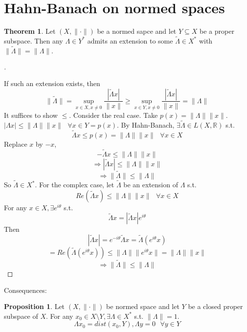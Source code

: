 \documentclass{article}
\newcommand{\sfa}{\text{  } \forall}
\theoremstyle{definition}
\newtheorem{thm}{Theorem}
\newtheorem{prop}{Proposition}
\newenvironment{proofs}[1][\proofname]{%
  \begin{proof}[#1]$ $\par\nobreak\ignorespaces
}{%
  \end{proof}
}
\begin{document}
\section{Hahn-Banach on normed spaces}

\begin{thm}
	Let $(X, \|\cdot \|)$ be a normed sapce and let $Y \subseteq X$ be a proper subspace. 
	Then any $\Lambda \in Y^*$ admits an extension to some $\tilde{\Lambda} \in X^*$ with $\| \tilde{\Lambda} \| = \|\Lambda \|$.
\end{thm}

\begin{proofs}
	If such an extension exists, then
	\[
		\|\tilde{\Lambda} \| = \sup_{x \in X, x \neq 0} \frac{|\tilde{\Lambda} x|}{\|x\|} \geq \sup_{x \in Y, x \neq 0} \frac{|\tilde{\Lambda} x|}{\|x\|} = \|\Lambda\|
	\]
	It suffices to show $\leq$.
	Consider the real case.
	Take $p(x) = \| \Lambda \| \| x \|$.
	$|\Lambda x| \leq \| \Lambda \| \| x \| \sfa x \in Y = p(x) $.
	By Hahn-Banach, $\exists \tilde{\Lambda} \in L(X, \mathbb{R})$ s.t.
	\[
		\tilde{\Lambda} x \leq p(x) = \| \Lambda \| \|x \| \sfa x \in X 
	\]
	Replace $x$ by $-x$,
	\[
		-\tilde{\Lambda} x \leq \| \Lambda \| \| x \|
	\]
	\[
		\Rightarrow | \tilde{\Lambda} x | \leq \| \Lambda \| \| x \|
	\]
	\[
		\Rightarrow \|\tilde{\Lambda} \| \leq \| \Lambda \|
	\]
	So $\tilde{\Lambda} \in X^*$.
	For the complex case, let $\tilde{\Lambda}$ be an extension of $\Lambda$ s.t.
	\[
		Re(\tilde{\Lambda} x) \leq \| \Lambda \| \|x \| \sfa x \in X
	\]
	For any $x \in X, \exists e^{i \theta}$ s.t.
	\[
		\tilde{\Lambda} x = |\tilde{\Lambda} x| e^{i \theta}
	\]
	Then 
	\[
		|\tilde{\Lambda} x| = e^{-i \theta} \tilde{\Lambda} x = \tilde{\Lambda} (e^{i \theta} x)
	\]
	\[
		= Re(\tilde{\Lambda} (e^{i \theta} x)) \leq \|\Lambda \| \| e^{i \theta} x \| = \| \Lambda \| \|x \|
	\]
	\[
		\Rightarrow \| \tilde{\Lambda} \| \leq  \| \Lambda \|
	\]

\end{proofs}

Consequences:

\begin{prop}
	Let $(X, \|\cdot \|)$ be normed space and let $Y$ be a closed proper subspace of $X$.
	For any $x_0 \in X \setminus Y, \exists \Lambda \in X^*$ s.t. $\| \Lambda \| = 1$.
	\[
		\Lambda x_0 = dist(x_0, Y), \Lambda y = 0 \sfa y \in Y
	\]
\end{prop}
\end{document}
